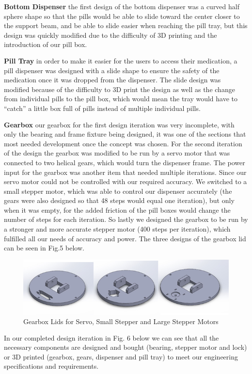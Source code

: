 \documentclass[12pt]{article}
\begin{document}
\par \textbf{Bottom Dispenser} the first design of the bottom dispenser was a curved half sphere shape so that the pills would be able to slide toward the center closer to the support beam, and be able to slide easier when reaching the pill tray, but this design was quickly modified due to the difficulty of 3D printing and the introduction of our pill box.
\par \textbf{Pill Tray} in order to make it easier for the users to access their medication, a pill dispenser was designed with a slide shape to ensure the safety of the medication once it was dropped from the dispenser. The slide design was modified because of the difficulty to 3D print the design as well as the change from individual pills to the pill box, which would mean the tray would have to “catch” a little box full of pills instead of multiple individual pills.
\par \textbf{Gearbox} our gearbox for the first design iteration was very incomplete, with only the bearing and frame fixture being designed, it was one of the sections that most needed development once the concept was chosen. For the second iteration of the design the gearbox was modified to be run by a servo motor that was connected to two helical gears, which would turn the dispenser frame. The power input for the gearbox was another item that needed multiple iterations. Since our servo motor could not be controlled with our required accuracy. We switched to a small stepper motor, which was able to control our dispenser accurately (the gears were also designed so that 48 steps would equal one iteration), but only when it was empty, for the added friction of the pill boxes would change the number of steps for each iteration. So lastly we designed the gearbox to be run by a stronger and more accurate stepper motor (400 steps per iteration), which fulfilled all our needs of accuracy and power. The three designs of the gearbox lid can be seen in Fig.5 below.
\begin{figure}[H]
	\centering
	\includegraphics[width=0.75\linewidth]{M6.jpg}
	\caption{Gearbox Lids for Servo, Small Stepper and Large Stepper Motors}
\end{figure}
\par In our completed design iteration in Fig. 6 below we can see that all the necessary components are designed and bought (bearing, stepper motor and lock) or 3D printed (gearbox, gears, dispenser and pill tray) to meet our engineering specifications and requirements.
\end{document}
